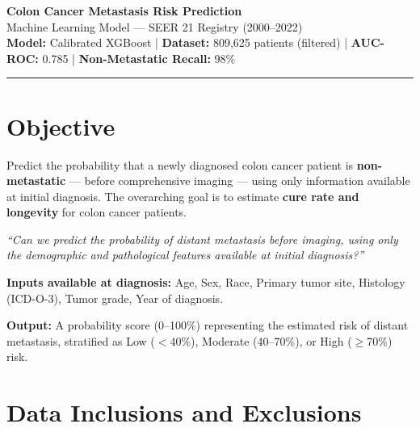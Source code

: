 \documentclass[11pt, a4paper]{article}
\begin{document}
\begin{center}
{\large\bfseries\color{seerblue} Colon Cancer Metastasis Risk Prediction}\\[2pt]
{\small\color{seerteal} Machine Learning Model — SEER 21 Registry (2000–2022)}\\[2pt]
{\footnotesize\color{gray}
\textbf{Model:} Calibrated XGBoost \quad|\quad
\textbf{Dataset:} 809,625 patients (filtered) \quad|\quad
\textbf{AUC-ROC:} 0.785 \quad|\quad
\textbf{Non-Metastatic Recall:} 98\%}
\end{center}

\vspace{4pt}
\noindent\rule{\linewidth}{0.6pt}
\vspace{2pt}

\section{Objective}

\noindent Predict the probability that a newly diagnosed colon cancer patient is
\textbf{non-metastatic} — before comprehensive imaging — using only information
available at initial diagnosis. The overarching goal is to estimate
\textbf{cure rate and longevity} for colon cancer patients.

\begin{tcolorbox}[colback=blue!4!white, colframe=seerblue, boxrule=0.4pt,
  left=4pt, right=4pt, top=3pt, bottom=3pt]
\footnotesize\textit{``Can we predict the probability of distant metastasis before
imaging, using only the demographic and pathological features available at initial
diagnosis?''}
\end{tcolorbox}

\vspace{2pt}
\noindent\textbf{Inputs available at diagnosis:}
Age, Sex, Race, Primary tumor site, Histology (ICD-O-3), Tumor grade, Year of diagnosis.

\noindent\textbf{Output:} A probability score (0–100\%) representing the estimated
risk of distant metastasis, stratified as Low ($<$40\%), Moderate (40–70\%), or
High ($\geq$70\%) risk.

\section{Data Inclusions and Exclusions}
\end{document}
